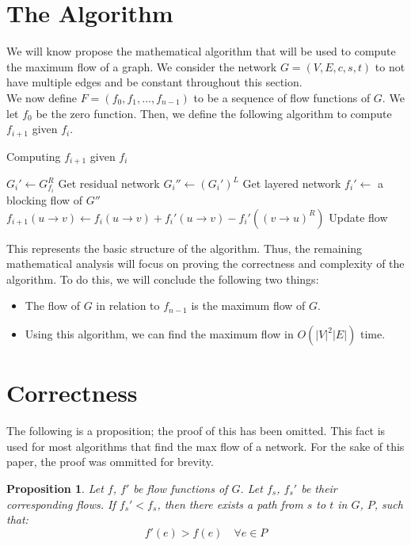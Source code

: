 \documentclass{report}
\newtheorem{proposition}{Proposition}[section]
\begin{document}
\section{The Algorithm}
We will know propose the mathematical algorithm that will be used to compute the maximum flow of a graph. We consider the network $G = (V, E, c, s, t)$ to not have multiple edges and be constant throughout this section.\\
We now define $F = (f_0, f_1, ..., f_{n-1})$ to be a sequence of flow functions of $G$. We let $f_0$ be the zero function. Then, we define the following algorithm to compute $f_{i+1}$ given $f_i$.
\begin{algorithm}
\caption{Computing $f_{i+1}$ given $f_i$}\label{alg:cap}
\begin{algorithmic}
    \State $G_i' \gets G_{f_i}^R$ \Comment Get residual network
    \State $G_i'' \gets (G_i')^L$ \Comment Get layered network
    \State $f_i' \gets$ a blocking flow of $G''$
    \State $f_{i+1}(u \rightarrow v) \gets f_i(u \rightarrow v) + f_i'(u \rightarrow v) - f_i'((v \rightarrow u)^R)$ \Comment Update flow
\end{algorithmic}
\end{algorithm}
This represents the basic structure of the algorithm. Thus, the remaining mathematical analysis will focus on proving the correctness and complexity of the algorithm. To do this, we will conclude the following two things:
\begin{itemize}
    \item
        The flow of $G$ in relation to $f_{n-1}$ is the maximum flow of $G$.
    \item
        Using this algorithm, we can find the maximum flow in $O(|V|^2|E|)$ time.
\end{itemize}

\section{Correctness}
The following is a proposition; the proof of this has been omitted. This fact is used for most algorithms that find the max flow of a network. For the sake of this paper, the proof was ommitted for brevity.
\begin{proposition}
    Let $f$, $f'$ be flow functions of $G$. Let $f_s$, $f_s'$ be their corresponding flows. If $f_s' < f_s$, then there exists a path from $s$ to $t$ in $G$, $P$, such that:
    $$f'(e) > f(e) \quad \forall e \in P$$
\end{proposition}
\end{document}
